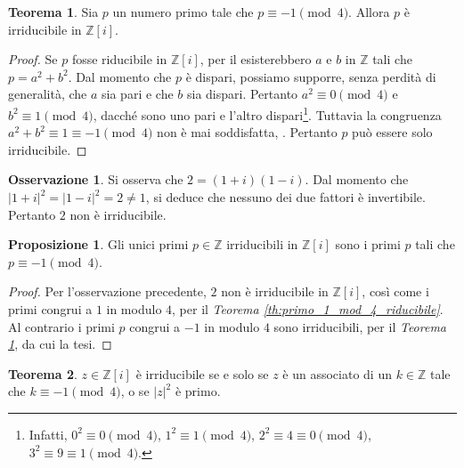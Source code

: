 \documentclass[a4paper]{article}
\newcommand{\norm}[1]{\left|#1\right|}
\newcommand{\ZZ}{\mathbb{Z}}
\newcommand{\ZZi}{\mathbb{Z}[i]}
\theoremstyle{definition}
\newtheorem*{note}{Osservazione}
\newtheorem{proposition}{Proposizione}[section]
\newtheorem{theorem}{Teorema}[section]
\begin{document}
\begin{theorem}
    \label{th:primo_-1_mod_4_irriducibile}
    Sia $p$ un numero primo tale che $p \equiv -1 \pmod4$. Allora
    $p$ è irriducibile in $\ZZi$.
\end{theorem}

\begin{proof}
    Se $p$ fosse riducibile in
    $\ZZi$, per il  esisterebbero $a$ e $b$
    in $\ZZ$ tali che $p=a^2+b^2$. Dal momento che $p$ è dispari,
    possiamo supporre, senza perdità di generalità, che
    $a$ sia pari e che $b$ sia dispari. Pertanto $a^2 \equiv 0 \pmod 4$ e $b^2 \equiv 1 \pmod 4$, dacché sono uno pari e l'altro dispari\footnote{Infatti, $0^2 \equiv 0
            \pmod4$, $1^2 \equiv 1 \pmod4$, $2^2 \equiv 4 \equiv 0 \pmod 4$,
        $3^2 \equiv 9 \equiv 1 \pmod 4$.}. Tuttavia la congruenza
    $a^2+b^2 \equiv 1 \equiv -1 \pmod4$ non è mai soddisfatta,
    \Lightning{}. Pertanto $p$ può essere solo irriducibile.
\end{proof}

\begin{note}
    Si osserva che $2=(1+i)(1-i)$. Dal momento che $\norm{1+i}^2=
        \norm{1-i}^2=2\neq1$, si deduce che nessuno dei due fattori
    è invertibile. Pertanto $2$ non è irriducibile.
\end{note}

\begin{proposition}
    \label{prop:irriducibili_zz_zzi}
    Gli unici primi $p \in \ZZ$ irriducibili in $\ZZi$ sono i primi $p$ tali
    che $p \equiv -1 \pmod4$.
\end{proposition}

\begin{proof}
    Per l'osservazione precedente, $2$ non è irriducibile in $\ZZi$,
    così come i primi congrui a $1$ in modulo $4$,
    per il \textit{Teorema \ref{th:primo_1_mod_4_riducibile}}. Al
    contrario i primi $p$ congrui a $-1$ in modulo $4$ sono
    irriducibili, per il \textit{Teorema \ref{th:primo_-1_mod_4_irriducibile}}, da cui la tesi.
\end{proof}

\begin{theorem}
    $z \in \ZZi$ è irriducibile se e solo se $z$ è un associato di un $k \in \ZZ$ tale che $k \equiv -1 \pmod 4$, o se $\norm{z}^2$ è primo.
\end{theorem}
\end{document}
